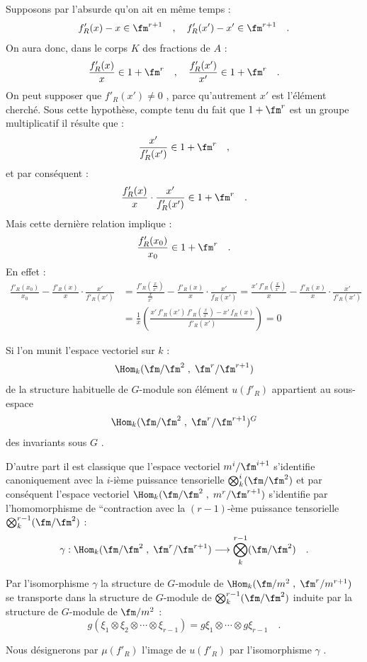 Supposons par l'absurde qu'on ait en même temps :
\[
f'_R(x) - x \in \fm^{r+1} \quad , \quad f'_R(x') - x' \in \fm^{r+1} \quad .
\]
On aura donc, dans le corps $K$ des fractions de $A$ :
\[
\frac{f'_R(x)}{x} \in 1 + \fm^r \quad , \quad \frac{f'_R(x')}{x'} \in 1 + \fm^r \quad .
\]
On peut supposer que $f'_R(x') \neq 0$ , parce qu'autrement $x'$ est l'élément cherché. Sous cette hypothèse, compte tenu du fait que $1 + \fm^r$ est un groupe multiplicatif il résulte que :
\[
\frac{x'}{f'_R(x')} \in 1 + \fm^r \quad ,
\]
et par conséquent :
\[
\frac{f'_R(x)}{x} \cdot \frac{x'}{f'_R(x')} \in 1 + \fm^r \quad .
\]
Mais cette dernière relation implique :
\[
\frac{f'_R(x_0)}{x_0} \in 1 + \fm^r \quad .
\]
En effet :
\[
\begin{aligned}
\frac{f'_R(x_0)}{x_0} - \frac{f'_R(x)}{x} \cdot \frac{x'}{f'_R(x')}
&= \frac{f'_R(\frac{x}{x'})}{\frac{x}{x'}} - \frac{f'_R(x)}{x} \cdot \frac{x'}{f_R(x')}
= \frac{x'\,f'_R(\frac{x}{x'})}{x} - \frac{f'_R(x)}{x} \cdot \frac{x'}{f'_R(x')} \\
&= \frac{1}{x}\left(\frac{x'\,f'_R(x')\,f'_R(\frac{x}{x'}) - x'\,f_R(x)}{f'_R(x')}\right) = 0
\end{aligned}
\]

Si l'on
munit l'espace vectoriel sur $k$ :
\[
\Hom_k(\fm/\fm^2 \; , \; \fm^r/\fm^{r+1})
\]
de la structure habituelle de $G$-module son élément $u(f'_R)$ appartient au sous-espace
\[
\Hom_k(\fm/\fm^2 \; , \; \fm^r/\fm^{r+1})^G
\]
des invariants sous $G$ .

D'autre part il est classique que l'espace vectoriel $m^i/\fm^{i+1}$ s'identifie canoniquement avec la $i$-ième puissance tensorielle $\bigotimes_k^i (\fm/\fm^2)$ et par conséquent l'espace vectoriel $\Hom_k(\fm/\fm^2 \; , \; m^r/\fm^{r+1})$ s'identifie par l'homomorphisme de ``contraction avec la $(r-1)$-ème puissance tensorielle $\bigotimes_k^{r-1}(\fm/\fm^2)$ :
\[
\gamma : \Hom_k(\fm/\fm^2 \; , \; \fm^r/\fm^{r+1}) \longrightarrow \bigotimes_k^{r-1}(\fm/\fm^2) \quad .
\]

Par l'isomorphisme $\gamma$ la structure de $G$-module de $\Hom_k(\fm/m^2 \; , \; \fm^r/m^{r+1})$ se transporte dans la structure de $G$-module de $\bigotimes_k^{r-1}(\fm/\fm^2)$ induite par la structure de $G$-module de $\fm/m^2$ :
\[
g(\xi_1 \otimes \xi_2 \otimes \cdots \otimes \xi_{r-1}) = g\xi_1 \otimes \cdots \otimes g\xi_{r-1} \quad .
\]

Nous désignerons par $\mu(f'_R)$ l'image de $u(f'_R)$ par l'isomorphisme $\gamma$ .

